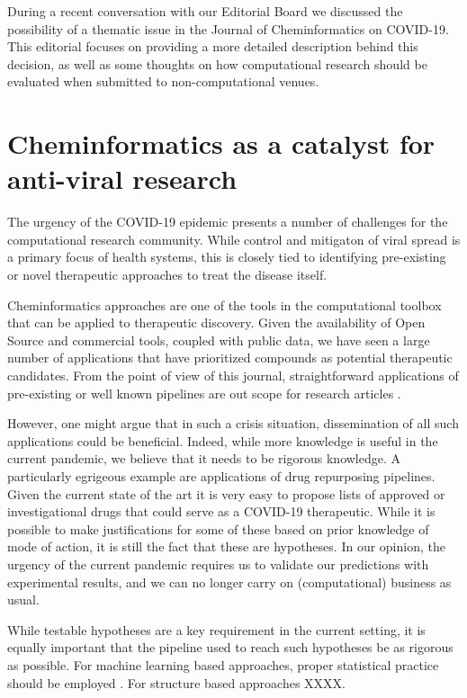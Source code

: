 \documentclass{bmcart}
\begin{document}
During a recent conversation with our Editorial Board we discussed the
possibility of a thematic issue in the Journal of Cheminformatics on
COVID-19. This editorial focuses on providing a more detailed
description behind this decision, as well as some thoughts on how
computational research should be evaluated when submitted to
non-computational venues.

\section*{Cheminformatics as a catalyst for anti-viral research}

The urgency of the COVID-19 epidemic presents a number of challenges
for the computational research community. While control and mitigaton of viral
spread is a primary focus of health systems, this is closely tied to
identifying pre-existing or novel therapeutic approaches to treat the
disease itself.

Cheminformatics approaches are one of the tools in the computational
toolbox that can be applied to therapeutic discovery. Given the
availability of Open Source and commercial tools, coupled with public
data, we have seen a large number of applications that have
prioritized compounds as potential therapeutic candidates. From the
point of view of this journal, straightforward applications of
pre-existing or well known pipelines are out scope for research
articles \cite{jcheminf_scope}.

However, one might argue that in such a crisis situation,
dissemination of all such applications could be beneficial. Indeed,
while more knowledge is useful in
the current pandemic, we believe that it needs to be rigorous
knowledge. A particularly egrigeous example are applications of drug
repurposing pipelines. Given the current state of the art it is very
easy to propose lists of approved or investigational drugs that could
serve as a COVID-19 therapeutic. While it is possible to make
justifications for some of these based on prior knowledge of mode of
action, it is still the fact that these are hypotheses. In our opinion,
the urgency of the current pandemic requires us to validate our
predictions with experimental results, and we can no longer carry on
(computational) business as usual.

While testable hypotheses are a key requirement in the current
setting, it is equally important that the pipeline used to reach such
hypotheses be as rigorous as possible. For machine learning based
approaches, proper statistical practice should be employed
\cite{cc_stats_1,cc_stats_2, cc_stats_3}. For
structure based approaches XXXX.
\end{document}
